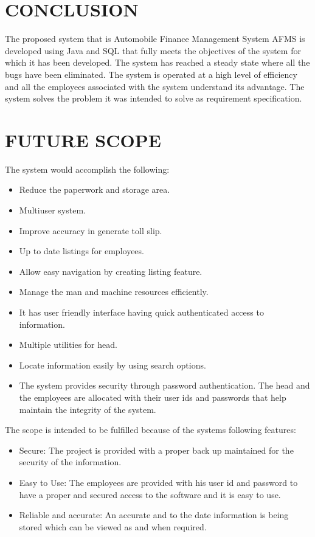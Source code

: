\section{CONCLUSION}
The proposed system  that is Automobile Finance Management  System AFMS is developed using Java and SQL that fully meets the objectives of the system for which it has been developed. The system has reached a steady state where all the bugs have been eliminated. The system is operated at a high level of efficiency and all the employees associated with the system understand its advantage. The system solves the problem it was intended to solve as requirement specification.

\section{FUTURE SCOPE}
The system would accomplish the following:
\begin{itemize}
\item Reduce the paperwork and storage area.
\item Multiuser system.
\item Improve accuracy in generate toll slip.
\item Up to date listings for employees.
\item Allow easy navigation by creating listing feature.
\item Manage the man and machine resources efficiently.
\item It has user friendly interface having quick authenticated access to information.
\item Multiple utilities for head.
\item Locate information easily by using search options.
\item The system provides security through password authentication. The head and the employees are allocated with their user ids and passwords that help maintain the integrity of the system.
\end{itemize}

The scope is intended to be fulfilled because of the systems following features:

\begin{itemize}
\item Secure: \newline
The project is provided with a proper back up maintained for the security of the information.
\item Easy to Use: \newline 
The employees are provided with his user id and password to have a proper and secured access to the software and it is easy to use.
\item Reliable and accurate:\newline 
          An accurate and to the date information is being stored which can be viewed as and when required. 

\end {itemize}

